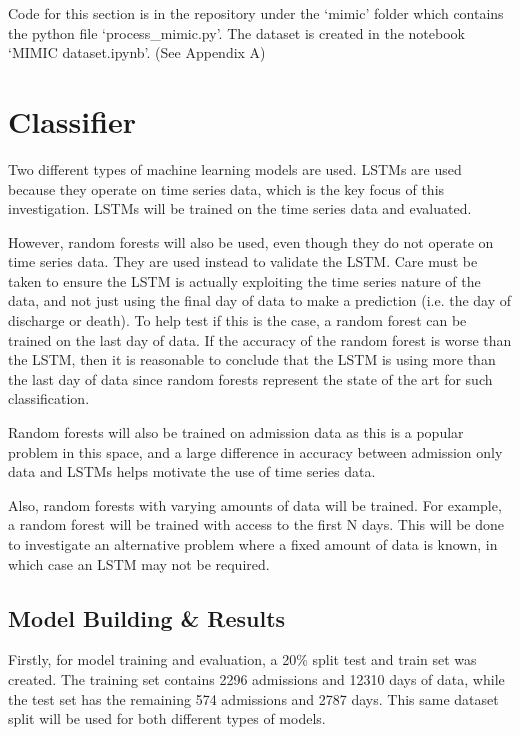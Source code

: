 \documentclass[12pt]{article}
\begin{document}
Code for this section is in the repository under the `mimic' folder which contains the python file `process\_mimic.py'. The dataset is created in the notebook `MIMIC dataset.ipynb'. (See Appendix A)

\section{Classifier}

Two different types of machine learning models are used. LSTMs are used because they operate on time series data, which is the key focus of this investigation. LSTMs will be trained on the time series data and evaluated. 

However, random forests will also be used, even though they do not operate on time series data. They are used instead to validate the LSTM. Care must be taken to ensure the LSTM is actually exploiting the time series nature of the data, and not just using the final day of data to make a prediction (i.e. the day of discharge or death). To help test if this is the case, a random forest can be trained on the last day of data. If the accuracy of the random forest is worse than the LSTM, then it is reasonable to conclude that the LSTM is using more than the last day of data since random forests represent the state of the art for such classification. 

Random forests will also be trained on admission data as this is a popular problem in this space, and a large difference in accuracy between admission only data and LSTMs helps motivate the use of time series data. 

Also, random forests with varying amounts of data will be trained. For example, a random forest will be trained with access to the first N days. This will be done to investigate an alternative problem where a fixed amount of data is known, in which case an LSTM may not be required. 

\subsection{Model Building \& Results}

Firstly, for model training and evaluation, a 20\% split test and train set was created. The training set contains 2296 admissions and 12310 days of data, while the test set has the remaining 574 admissions and 2787 days. This same dataset split will be used for both different types of models. 
\end{document}
